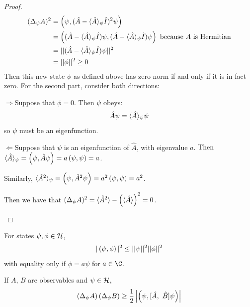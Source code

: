 \documentclass[../Main.tex]{subfiles}
\begin{document}
\begin{proof}
    \begin{align*}
        (\Delta_\psi A)^2 &= \left(\psi,(\hat{A} - \langle \hat{A} \rangle_\psi \hat{I})^2 \psi\right) \\
        &= \left((\hat{A} - \langle \hat{A} \rangle_\psi \hat{I})\psi,(\hat{A} - \langle \hat{A} \rangle_\psi \hat{I})\psi\right) \text{ because $A$ is Hermitian} \\
        &= ||(\hat{A} - \langle \hat{A} \rangle_\psi \hat{I})\psi||^2 \\
        &= ||\phi||^2 \geq 0
    \end{align*}
    Then this new state $\phi$ as defined above has zero norm if and only if it is in fact zero.
    For the second part, consider both directions:
    \begin{proofdirection}{$\Rightarrow$}{Suppose that $\phi = 0$.}
        Then $\psi$ obeys:
        \begin{equation*}
            \hat{A} \psi = \langle \hat{A} \rangle_\psi \psi
        \end{equation*}
        so $\psi$ must be an eigenfunction.
    \end{proofdirection}
    \begin{proofdirection}{$\Leftarrow$}{Suppose that $\psi$ is an eigenfunction of $\hat{A}$, with eigenvalue $a$.}
        Then $\langle \hat{A} \rangle_\psi = \left(\psi,\hat{A}\psi\right) = a\left(\psi,\psi\right) = a$.

        Similarly, $\langle \hat{A}^2 \rangle_\psi = \left(\psi,\hat{A}^2\psi\right) = a^2\left(\psi,\psi\right) = a^2$.

        Then we have that $(\Delta_\psi A)^2 = \langle \hat{A}^2 \rangle - \left(\langle \hat{A} \rangle\right)^2 = 0$.
    \end{proofdirection}
\end{proof}
\begin{lemma}
    For states $\psi, \phi \in \mathcal{H}$,
    \begin{equation*}
        |\left(\psi,\phi\right)|^2 \leq ||\psi||^2 ||\phi||^2
    \end{equation*}
    with equality only if $\phi = a\psi$ for $a \in \C$.
    \label{lemStateCSIneq}
\end{lemma}
\begin{theorem}
    If $A$, $B$ are observables and $\psi \in \mathcal{H}$,
    \begin{equation}
        \left(\Delta_\psi A\right)\left(\Delta_\psi B\right) \geq \frac12 \left|\left(\psi,[\hat{A},~\hat{B}]\psi\right)\right|
        \label{eqnUncertaintyPrinciple}
    \end{equation}
    \label{thmUncertaintyPrinciple}
\end{theorem}
\end{document}

